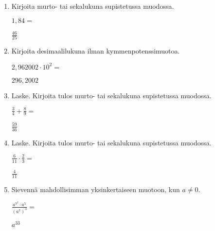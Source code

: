 \documentclass[finnish, a4paper, 12pt]{article}
\begin{document}
	\begin{enumerate}[leftmargin=*]
		\setlength\itemsep{1em}
		
		\item %
		Kirjoita murto- tai sekalukuna supistetussa muodossa. 
		
		\(
		1{,}84 = 
		\) %
		
		\begin{version:withAnswers}
		\( \frac{46}{25} \)
		\end{version:withAnswers}

		\vspace{8pt}
		
		\item %
		Kirjoita desimaalilukuna ilman kymmenpotenssimuotoa. 
		
		\(
		2{,}962002\cdot 10^{2} = 
		\) %
		\begin{version:withAnswers}
		\( 296,2002 \)
		\end{version:withAnswers}	
		\vspace{8pt}
		
		\item %
		Laske. Kirjoita tulos murto- tai sekalukuna supistetussa muodossa.
		
		\(
		\displaystyle
		\frac{3}{4}+\frac{8}{9} = 
		\) %
		\begin{version:withAnswers}
		\( \frac{59}{36} \)
		\end{version:withAnswers}	
		
		\vspace{8pt}
		
		\item %
		Laske. Kirjoita tulos murto- tai sekalukuna supistetussa muodossa.
		
		\(
		\displaystyle
		\frac{6}{11}\cdot\frac{2}{3} = 
		\) %
		\begin{version:withAnswers}
		\( \frac{4}{11} \)
		\end{version:withAnswers}
		
		\vspace{8pt}
		
		\item %
		Sievennä mahdollisimman yksinkertaiseen muotoon, kun \(a \not = 0\). 
		
		\(
		\displaystyle
		\frac{a^{7^2}\cdot a^5}{\left(a^7\right)^3} =
		\phantom{mmmmmmmmmmmmmmm}
		\) %
		\begin{version:withAnswers}
		\(  a^{33} \)
		\end{version:withAnswers}
		

\end{enumerate}
\end{document}
